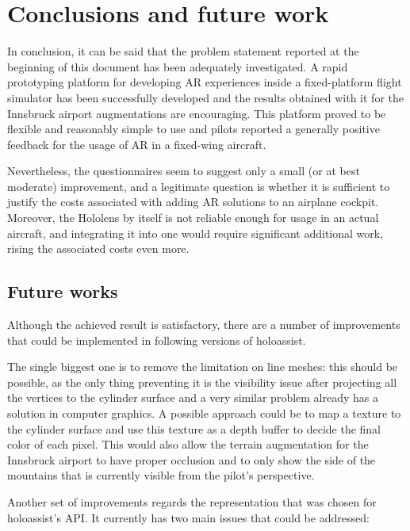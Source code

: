 
\chapter{Conclusions and future work}\label{chapter:conclusions_and_future_work}

In conclusion, it can be said that the problem statement reported at the beginning of this document has been adequately investigated. A rapid prototyping platform for developing \gls{AR} experiences inside a fixed-platform flight simulator has been successfully developed and the results obtained with it for the Innsbruck airport augmentations are encouraging. This platform proved to be flexible and reasonably simple to use and pilots reported a generally positive feedback for the usage of \gls{AR} in a fixed-wing aircraft.

Nevertheless, the questionnaires seem to suggest only a small (or at best moderate) improvement, and a legitimate question is whether it is sufficient to justify the costs associated with adding \gls{AR} solutions to an airplane cockpit. Moreover, the Hololens by itself is not reliable enough for usage in an actual aircraft, and integrating it into one would require significant additional work, rising the associated costs even more.

\section{Future works}

Although the achieved result is satisfactory, there are a number of improvements that could be implemented in following versions of \gls{holoassist}.

The single biggest one is to remove the limitation on line meshes: this should be possible, as the only thing preventing it is the visibility issue after projecting all the vertices to the cylinder surface and a very similar problem already has a solution in computer graphics\cite{khronos_group_depth_nodate}. A possible approach could be to map a texture to the cylinder surface and use this texture as a depth buffer to decide the final color of each pixel. This would also allow the terrain augmentation for the Innsbruck airport to have proper occlusion and to only show the side of the mountains that is currently visible from the pilot's perspective.

Another set of improvements regards the representation that was chosen for \gls{holoassist}'s \gls{API}. It currently has two main issues that could be addressed:

